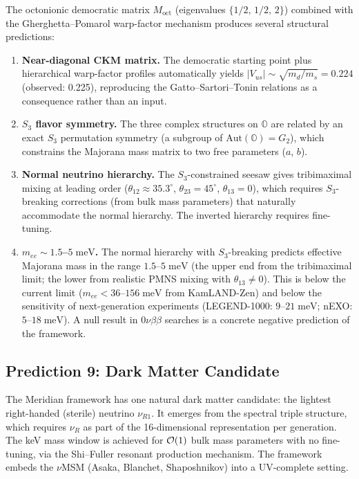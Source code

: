 The octonionic democratic matrix $M_\mathrm{oct}$ (eigenvalues $\{1/2,\, 1/2,\, 2\}$) combined with the Gherghetta--Pomarol warp-factor mechanism produces several structural predictions:
\begin{enumerate}
\item \textbf{Near-diagonal CKM matrix.} The democratic starting point plus hierarchical warp-factor profiles automatically yields $|V_{us}| \sim \sqrt{m_d/m_s} = 0.224$ (observed: 0.225), reproducing the Gatto--Sartori--Tonin relations as a consequence rather than an input.
\item \textbf{$S_3$ flavor symmetry.} The three complex structures on $\mathbb{O}$ are related by an exact $S_3$ permutation symmetry (a subgroup of $\mathrm{Aut}(\mathbb{O}) = G_2$), which constrains the Majorana mass matrix to two free parameters ($a$, $b$).
\item \textbf{Normal neutrino hierarchy.} The $S_3$-constrained seesaw gives tribimaximal mixing at leading order ($\theta_{12} \approx 35.3^\circ$, $\theta_{23} = 45^\circ$, $\theta_{13} = 0$), which requires $S_3$-breaking corrections (from bulk mass parameters) that naturally accommodate the normal hierarchy. The inverted hierarchy requires fine-tuning.
\item \textbf{$m_{ee} \sim 1.5$--$5\;\mathrm{meV}$.} The normal hierarchy with $S_3$-breaking predicts effective Majorana mass in the range $1.5$--$5\;\mathrm{meV}$ (the upper end from the tribimaximal limit; the lower from realistic PMNS mixing with $\theta_{13} \neq 0$). This is below the current limit ($m_{ee} < 36$--$156\;\mathrm{meV}$ from KamLAND-Zen) and below the sensitivity of next-generation experiments (LEGEND-1000: $9$--$21\;\mathrm{meV}$; nEXO: $5$--$18\;\mathrm{meV}$). A null result in $0\nu\beta\beta$ searches is a concrete negative prediction of the framework.
\end{enumerate}

\subsection{Prediction 9: Dark Matter Candidate}
\label{sec:1-pred9}

The Meridian framework has one natural dark matter candidate: the lightest right-handed (sterile) neutrino $\nu_{R1}$. It emerges from the spectral triple structure, which requires $\nu_R$ as part of the 16-dimensional representation per generation. The keV mass window is achieved for $\mathcal{O}\!\left(1\right)$ bulk mass parameters with no fine-tuning, via the Shi--Fuller resonant production mechanism. The framework embeds the $\nu$MSM (Asaka, Blanchet, Shaposhnikov) into a UV-complete setting.

